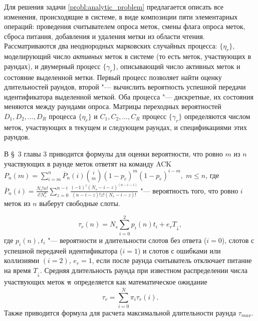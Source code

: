 Для решения задачи \ref{probl:analytic_problem} предлагается описать все изменения, происходящие в системе, в виде композиции пяти элементарных операций: проведения считывателем опроса меток, смены флага опроса меток, сброса питания, добавления и удаления метки из области чтения. Рассматриваются два неоднородных марковских случайных процесса: $\{ \eta_r \}$, моделирующий число \textit{активных} меток в системе (то есть меток, участвующих в раундах), и двумерный процесс $\{ \gamma_r \}$, описывающий число активных меток и состояние выделенной метки. Первый процесс позволяет найти оценку длительностей раундов, второй "--- вычислить вероятность успешной передачи идентификатора выделенной меткой. Оба процесса "--- дискретные, их состояния меняются между раундами опроса. Матрицы переходных вероятностей $D_1, D_2, \dots, D_R$ процесса $\{ \eta_r \}$ и $C_1, C_2, \dots, C_R$ процесс $\{ \gamma_r \}$ определяются числом меток, участвующих в текущем и следующем раундах, и спецификациями этих раундов.

В \S~3 главы 3 приводится формулы для оценки вероятности, что ровно $m$ из $n$ участвующих в раунде меток ответят на команду ACK $P_n(m) = \sum_{i=m}^n \overline{P}_n(i) {i \choose m}\left( 1 - p_e \right)^m \left( 1 - p_e \right)^{i - m},\; m \leqslant n$, где $\overline{P}_n(i) = \frac{N_s! n!}{i! N_s^n} \sum\limits_{z=0}^{n-i} \frac{(-1)^z (N_s - i - z)^{(n - i - z)}}{(n - i - z)! z! (N_s - i - z)!}$ "--- вероятность того, что ровно $i$ меток из $n$ выберут свободные слоты.

\begin{equation}\label{eq:round_duration_of_n}
	\tau_r(n) = N_s \sum\limits_{i=0}^{2}p_i(n)t_i + e_r T_\downarrow,
\end{equation}
где $p_i(n), t_i$ "--- вероятности и длительности слотов без ответа ($i = 0$), слотов с успешной передачей идентификатора ($i = 1$) и слотов с ошибками или коллизиями $(i = 2)$, $e_r = 1$, если после раунда считыватель отключает питание на время $T_{\downarrow}$. Средняя длительность раунда при известном распределении числа участвующих меток $\bm{\pi}$ определяется как математическое ожидание
\begin{equation}\label{eq:avg_round_duration}
  \tau_r = \sum_{i = 0}^{\overline{N}} \pi_i \tau_r(i).
\end{equation}
Также приводится формула для расчета максимальной длительности раунда $\tau_{max}$.


